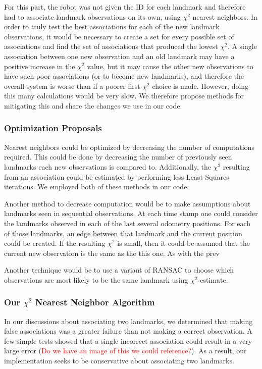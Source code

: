 \documentclass[12pt]{article}
\begin{document}
For this part, the robot was not given the ID for each landmark and therefore had to associate landmark observations on its own, using $\chi^2$ nearest neighbors.  In order to truly test the best associations for each of the new landmark observations, it would be necessary to create a set for every possible set of associations and find the set of associations that produced the lowest $\chi^2$.  A single association between one new observation and an old landmark may have a positive increase in the $\chi^2$ value, but it may cause the other new observations to have such poor associations (or to become new landmarks), and therefore the overall system is worse than if a poorer first $\chi^2$ choice is made.  However, doing this many calculations would be very slow.  We therefore propose methods for mitigating this and share the changes we use in our code.

\subsubsection*{Optimization Proposals}
Nearest neighbors could be optimized by decreasing the number of computations required.  This could be done by decreasing the number of previously seen landmarks each new observations is compared to.  Additionally, the $\chi^2$ resulting from an association could be estimated by performing less Least-Squares iterations. We employed both of these methods in our code.

Another method to decrease computation would be to make assumptions about landmarks seen in sequential observations.  At each time stamp one could consider the landmarks observed in each of the last several odometry positions.  For each of those landmarks, an edge between that landmark and the current position could be created.  If the resulting $\chi^2$ is small, then it could be assumed that the current new observation is the same as the this one.  As with the prev

Another technique would be to use a variant of RANSAC to choose which observations are most likely to be the same landmark using $\chi^2$ estimate.

\subsubsection*{Our $\chi^2$ Nearest Neighbor Algorithm}
In our discussions about associating two landmarks, we determined that making false associations was a greater failure than not making a correct observation.  A few simple tests showed that a single incorrect association could result in a very large error (\textcolor{red}{Do we have an image of this we could reference?}).  As a result, our implementation seeks to be conservative about associating two landmarks.
\end{document}
